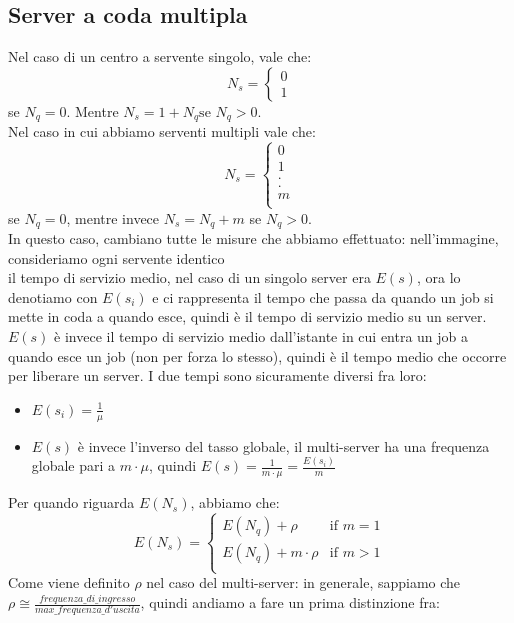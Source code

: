 \documentclass{article}
\begin{document}
\subsection{Server a coda multipla}
Nel caso di un centro a servente singolo, vale che:
\[
N_s =
\begin{cases}
0 \\
1
\end{cases}
\]
se $N_q = 0$. Mentre $N_s = 1 + N_q \text{se } N_q > 0$. \\ Nel caso in cui abbiamo serventi multipli vale che:
\[
N_s = 
\begin{cases}
0 \\
1 \\
. \\
. \\
m \\
\end{cases}
\]
se $N_q = 0$, mentre invece $N_s = N_q + m$ se $N_q > 0$.\\
In questo caso, cambiano tutte le misure che abbiamo effettuato:
nell'immagine, consideriamo ogni servente identico\\
il tempo di servizio medio, nel caso di un singolo server era $E(s)$, ora lo denotiamo con $E(s_i)$ e ci rappresenta il tempo che passa da quando un job si mette in coda a quando esce, quindi è il tempo di servizio medio su un server.\\ $E(s)$ è invece il tempo di servizio medio dall'istante in cui entra un job a quando esce un job (non per forza lo stesso), quindi è il tempo medio che occorre per liberare un server. I due tempi sono sicuramente diversi fra loro:
\begin{itemize}
\item $E(s_i) = \frac{1}{\mu}$
\item $E(s)$ è invece l'inverso del tasso globale, il multi-server ha una frequenza globale pari a $m\cdot \mu$, quindi $E(s) = \frac{1}{m\cdot \mu} = \frac{E(s_i)}{m}$
\end{itemize}
Per quando riguarda $E(N_s)$, abbiamo che:
\[
E(N_s) =
\begin{cases}
E(N_q) + \rho & \text{if } m = 1\\
E(N_q) + m\cdot \rho & \text{if } m > 1\\
\end{cases}
\]
Come viene definito $\rho$ nel caso del multi-server: in generale, sappiamo che $\rho \cong \frac{frequenza\_di\_ingresso}{max\_frequenza\_d'uscita}$, quindi andiamo a fare un prima distinzione fra:
\end{document}
